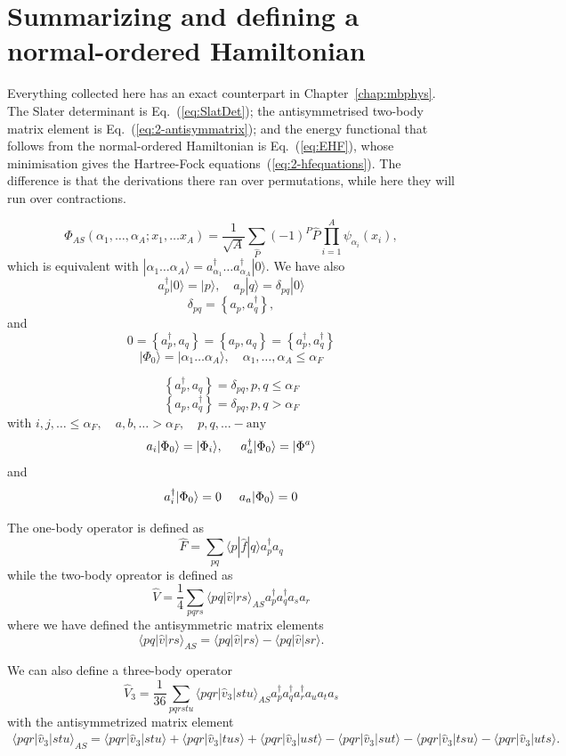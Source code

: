 \section{Summarizing and defining a normal-ordered Hamiltonian}

Everything collected here has an exact counterpart in
Chapter~\ref{chap:mbphys}.  The Slater determinant is
Eq.~(\ref{eq:SlatDet}); the antisymmetrised two-body matrix element is
Eq.~(\ref{eq:2-antisymmatrix}); and the energy functional that follows from
the normal-ordered Hamiltonian is Eq.~(\ref{eq:EHF}), whose minimisation gives
the Hartree-Fock equations~(\ref{eq:2-hfequations}).  The difference is that
the derivations there ran over permutations, while here they will run over
contractions.


\[
  \Phi_{AS}(\alpha_1, \dots, \alpha_A; x_1, \dots x_A)=
            \frac{1}{\sqrt{A}} \sum_{\hat{P}} (-1)^P \hat{P} \prod_{i=1}^A \psi_{\alpha_i}(x_i),
\]
which is equivalent with $|\alpha_1 \dots \alpha_A\rangle= a_{\alpha_1}^{\dagger} \dots a_{\alpha_A}^{\dagger} |0\rangle$. We have also
    \[
        a_p^\dagger|0\rangle = |p\rangle, \quad a_p |q\rangle = \delta_{pq}|0\rangle
    \]
\[
  \delta_{pq} = \left\{a_p, a_q^\dagger \right\},
\]
and 
\[
0 = \left\{a_p^\dagger, a_q \right\} = \left\{a_p, a_q \right\} = \left\{a_p^\dagger, a_q^\dagger \right\}
\]
\[
|\Phi_0\rangle = |\alpha_1 \dots \alpha_A\rangle, \quad \alpha_1, \dots, \alpha_A \leq \alpha_F
\]

\[
\left\{a_p^\dagger, a_q \right\}= \delta_{pq}, p, q \leq \alpha_F 
\]
\[
\left\{a_p, a_q^\dagger \right\} = \delta_{pq}, p, q > \alpha_F
\]
with         $i,j,\ldots \leq \alpha_F, \quad a,b,\ldots > \alpha_F, \quad p,q, \ldots - \textrm{any}$
\[
        a_i|\Phi_0\rangle = |\Phi_i\rangle, \hspace{0.5cm} a_a^\dagger|\Phi_0\rangle = |\Phi^a\rangle
\]
and         
\[
a_i^\dagger|\Phi_0\rangle = 0 \hspace{0.5cm}  a_a|\Phi_0\rangle = 0
\]

The one-body operator is defined as
\[
 \hat{F} = \sum_{pq} \langle p|\hat{f}|q\rangle a_p^\dagger a_q
\]
while the two-body opreator is defined as
\[
\hat{V} = \frac{1}{4} \sum_{pqrs} \langle pq|\hat{v}|rs\rangle_{AS} a_p^\dagger a_q^\dagger a_s a_r
\]
where we have defined the antisymmetric matrix elements
\[
\langle pq|\hat{v}|rs\rangle_{AS} = \langle pq|\hat{v}|rs\rangle - \langle pq|\hat{v}|sr\rangle.
\]

We can also define a three-body operator
\[
\hat{V}_3 = \frac{1}{36} \sum_{pqrstu} \langle pqr|\hat{v}_3|stu\rangle_{AS} 
                a_p^\dagger a_q^\dagger a_r^\dagger a_u a_t a_s
\]
with the antisymmetrized matrix element
\begin{align}
            \langle pqr|\hat{v}_3|stu\rangle_{AS} = \langle pqr|\hat{v}_3|stu\rangle + \langle pqr|\hat{v}_3|tus\rangle + \langle pqr|\hat{v}_3|ust\rangle- \langle pqr|\hat{v}_3|sut\rangle - \langle pqr|\hat{v}_3|tsu\rangle - \langle pqr|\hat{v}_3|uts\rangle.
\end{align}


